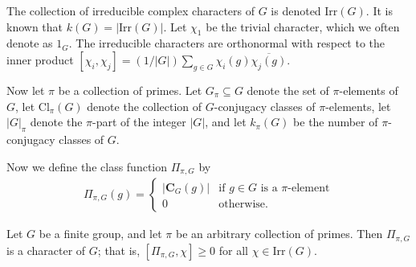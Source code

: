 
\newcommand{\mr}[1]{\mathrm{#1}}

\newcommand{\Irr}[1]{\mathrm{Irr}(#1)}

\newcommand{\q}[1]{\overline{#1}}

The collection of irreducible complex characters of $G$ is denoted $\Irr{G}$. It is known that $k(G)=|\Irr{G}|$. Let $\chi_1$ be the trivial character, which we often denote as $1_G$. The irreducible characters are orthonormal with respect to the inner product $[\chi_i, \chi_j] = (1/|G|) \sum_{g \in G} \chi_i(g) \q{\chi_j(g)}$.

Now let $\pi$ be a collection of primes. Let $G_\pi \subseteq G$ denote the set of $\pi$-elements of~$G$, let $\mr{Cl}_\pi(G)$ denote the collection of $G$-conjugacy classes of $\pi$-elements, let $|G|_\pi$ denote the $\pi$-part of the integer $|G|$, and let $k_{\pi}(G)$ be the number of $\pi$-conjugacy classes of $G$.

Now we define the class function $\Pi_{\pi,G}$ by
\begin{align*}
    \Pi_{\pi,G}(g) = \begin{cases}
        |\mathbf{C}_G(g)| & \text{if $g \in G$ is a $\pi$-element} \\
        0 & \text{otherwise}.
    \end{cases}
\end{align*}

\begin{conjecture}\label{c:Picharacter}
Let $G$ be a finite group, and let $\pi$ be an arbitrary collection of primes. Then $\Pi_{\pi,G}$ is a character of $G$; that is, $[\Pi_{\pi,G},\chi] \ge 0$ for all $\chi \in \Irr{G}$. 
\end{conjecture}
